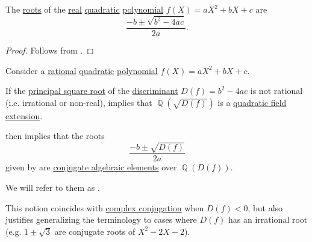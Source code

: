 \begin{proposition}\label{thm:real_quadratic_polynomial_roots}
  The \hyperref[def:root_of_polynomial]{roots} of the \hyperref[def:real_numbers]{real} \hyperref[def:polynomial_degree_terminology]{quadratic} \hyperref[def:polynomial_algebra]{polynomial} \( f(X) = a X^2 + b X + c \) are
  \begin{equation}\label{eq:def:conjugate_quadratic_roots}
    \frac {-b \pm \sqrt{b^2 - 4ac}} {2a}.
  \end{equation}
\end{proposition}
\begin{proof}
  Follows from .
\end{proof}

\begin{remark}\label{rem:conjugate_quadratic_roots}\mimprovised
  Consider a \hyperref[def:rational_numbers]{rational} \hyperref[def:polynomial_degree_terminology]{quadratic} \hyperref[def:polynomial_algebra]{polynomial} \( f(X) = a X^2 + b X + c \).

  If the \hyperref[def:principal_real_square_root]{principal square root} of the \hyperref[def:discriminant]{discriminant} \( D(f) = b^2 - 4ac \) is not rational (i.e. irrational or non-real),  implies that \( \BbbQ(\sqrt{D(f)}) \) is a \hyperref[def:field_extension_degree]{quadratic field extension}.

   then implies that the roots
  \begin{equation*}
    \frac {-b \pm \sqrt{D(f)}} {2a}
  \end{equation*}
  given by  are \hyperref[def:conjugate_algebraic_element]{conjugate algebraic elements} over \( \BbbQ(D(f)) \).

  We will refer to them as .
\end{remark}
\begin{comments}
  \item This notion coincides with \hyperref[def:complex_conjugation]{complex conjugation} when \( D(f) < 0 \), but also justifies generalizing the terminology to cases where \( D(f) \) has an irrational root (e.g. \( 1 \pm \sqrt 3 \) are conjugate roots of \( X^2 - 2X - 2 \)).
\end{comments}

